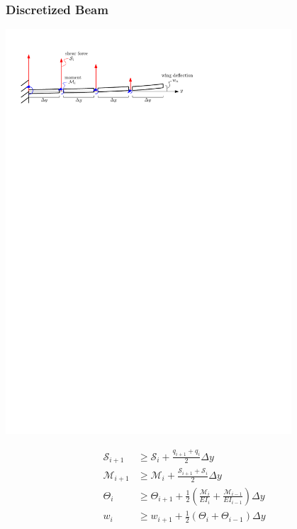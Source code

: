\documentclass{beamer}
\begin{document}
\begin{frame}
    \frametitle{Discretized Beam}

    \pause
    \begin{center}
        \includegraphics[width=0.8\textwidth]{disctbeam.pdf}
    \end{center}

    \pause
    \begin{align*}
        \mathcal{S}_{i+1} &\geq \mathcal{S}_i + \frac{q_{i+1} + q_i}{2} \Delta y \\
        \mathcal{M}_{i+1} &\geq \mathcal{M}_i + \frac{\mathcal{S}_{i+1} + \mathcal{S}_i}{2} \Delta y \\
        \Theta_{i} &\geq \Theta_{i+1} + \frac{1}{2} \left(\frac{\mathcal{M}_i}{EI_i} + \frac{\mathcal{M}_{i-1}}{EI_{i-1}} \right) \Delta y \\
        w_{i} &\geq w_{i+1} + \frac{1}{2} (\Theta_i + \Theta_{i-1}) \Delta y 
    \end{align*}
\end{frame}
\end{document}
